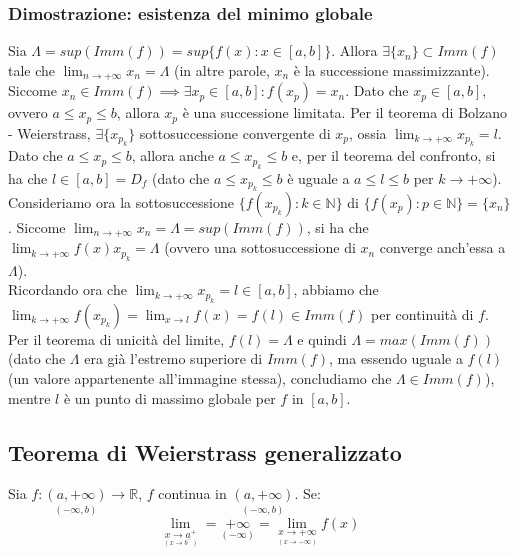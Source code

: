 \documentclass{article}
\begin{document}
\subsubsection{Dimostrazione: esistenza del minimo globale}
Sia $\Lambda = sup(Imm(f)) = sup\{f(x) : x \in [a, b]\}$. Allora $\exists \{x_n\} \subset Imm(f)$ tale che $\lim_{n \to +\infty} x_n = \Lambda$ (in altre parole, $x_n$ è la successione massimizzante).\\
Siccome $x_n \in Imm(f) \implies \exists x_p \in [a, b] : f(x_p) = x_n$. Dato che $x_p \in [a, b]$, ovvero $a \leq x_p \leq b$, allora $x_p$ è una successione limitata. Per il teorema di Bolzano - Weierstrass, $\exists \{x_{p_k}\}$ sottosuccessione convergente di $x_{p}$, ossia $\lim_{k \to +\infty} x_{p_k} = l$.\\
Dato che $a \leq x_p \leq b$, allora anche $a \leq x_{p_k} \leq b$ e, per il teorema del confronto, si ha che $l \in [a, b] = D_f$ (dato che $a \leq x_{p_k} \leq b$ è uguale a $a \leq l \leq b$ per $k \to +\infty$).\\
Consideriamo ora la sottosuccessione $\{f(x_{p_k}) : k \in \mathbb{N}\}$ di $\{f(x_{p}) : p \in \mathbb{N}\} = \{x_n\}$. Siccome $\lim_{n \to +\infty} x_n = \Lambda = sup(Imm(f))$, si ha che $\lim_{k \to +\infty} f(x) x_{p_k} = \Lambda$ (ovvero una sottosuccessione di $x_n$ converge anch'essa a $\Lambda$).\\
Ricordando ora che $\lim_{k \to +\infty} x_{p_k} = l \in [a, b]$, abbiamo che $\lim_{k \to +\infty} f(x_{p_k}) = \lim_{x \to l} f(x) = f(l) \in Imm(f)$ per continuità di $f$.\\
Per il teorema di unicità del limite, $f(l) = \Lambda$ e quindi $\Lambda = max(Imm(f))$ (dato che $\Lambda$ era già l'estremo superiore di $Imm(f)$, ma essendo uguale a $f(l)$ (un valore appartenente all'immagine stessa), concludiamo che $\Lambda \in Imm(f)$), mentre $l$ è un punto di massimo globale per $f$ in $[a, b]$.

\subsection{Teorema di Weierstrass generalizzato}
Sia $f: \underset{(-\infty, b)}{(a, +\infty)} \xrightarrow{} \mathbb{R}$, $f$ continua in $\underset{(-\infty, b)}{(a, +\infty)}$. Se:
\begin{equation*}
    \lim_{\underset{\scriptstyle (x \to b^-)}{x \to a^+}} = \underset{(-\infty)}{+\infty} = \lim_{\underset{\scriptstyle (x \to -\infty)}{x \to +\infty}} f(x)
\end{equation*}
\end{document}
